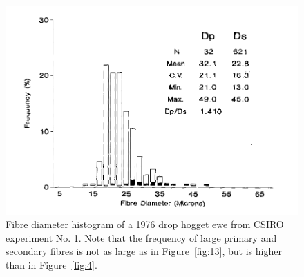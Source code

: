 %

\begin{figure}[h]
  \centering
  \includegraphics[width=\textwidth,trim = 0 0 0 120]{images/fig15ri.png}
  \caption{ Fibre diameter histogram of a 1976 drop hogget ewe from CSIRO
      experiment No. 1.  Note that the frequency of large primary and
      secondary fibres is not as large as in Figure~\ref{fig:13},
      but is higher than in Figure~\ref{fig:4}.}
  \label{fig:15}
\end{figure}

%
